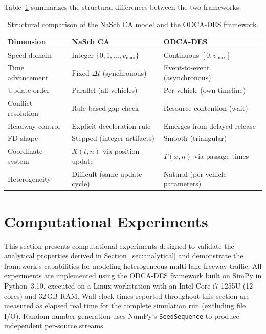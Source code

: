 \documentclass[review,authoryear]{elsarticle}
\begin{document}
Table~\ref{tab:comparison_summary} summarizes the structural differences between the two frameworks.

\begin{table}[ht]
\centering
\caption{Structural comparison of the NaSch CA model and the ODCA-DES framework.}
\label{tab:comparison_summary}
\begin{tabular}{@{}lll@{}}
\toprule
Dimension & NaSch CA & ODCA-DES \\
\midrule
Speed domain & Integer $\{0,1,\ldots,v_{\max}\}$ & Continuous $[0, v_{\max}]$ \\
Time advancement & Fixed $\Delta t$ (synchronous) & Event-to-event (asynchronous) \\
Update order & Parallel (all vehicles) & Per-vehicle (own timeline) \\
Conflict resolution & Rule-based gap check & Resource contention (wait) \\
Headway control & Explicit deceleration rule & Emerges from delayed release \\
FD shape & Stepped (integer artifacts) & Smooth (triangular) \\
Coordinate system & $X(t,n)$ via position update & $T(x,n)$ via passage times \\
Heterogeneity & Difficult (same update cycle) & Natural (per-vehicle parameters) \\
\bottomrule
\end{tabular}
\end{table}


\section{Computational Experiments}
\label{sec:experiments}

This section presents computational experiments designed to validate the analytical properties derived in Section~\ref{sec:analytical} and demonstrate the framework's capabilities for modeling heterogeneous multi-lane freeway traffic. All experiments are implemented using the ODCA-DES framework built on SimPy \citep{simpy2023} in Python~3.10, executed on a Linux workstation with an Intel Core i7-1255U (12 cores) and 32\,GB RAM. Wall-clock times reported throughout this section are measured as elapsed real time for the complete simulation run (excluding file I/O). Random number generation uses NumPy's \texttt{SeedSequence} to produce independent per-source streams.
\end{document}
